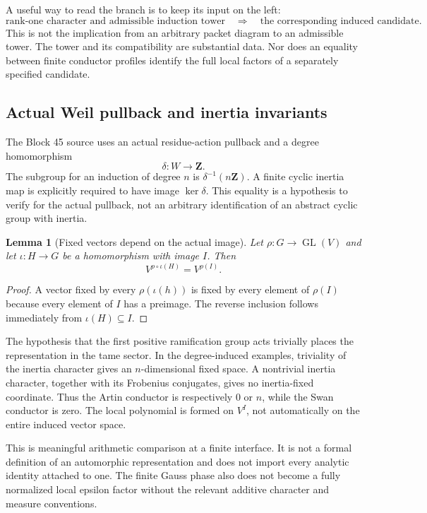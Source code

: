 \documentclass[11pt]{article}
\newtheorem{lemma}[proposition]{Lemma}
\theoremstyle{definition}\newtheorem{definition}[proposition]{Definition}
\newcommand{\GL}{\operatorname{GL}}
\newcommand{\Z}{\mathbf Z}
\begin{document}
A useful way to read the branch is to keep its input on the left:
\[
 \text{rank-one character and admissible induction tower}
 \quad\Longrightarrow\quad
 \text{the corresponding induced candidate}.
\]
This is not the implication from an arbitrary packet diagram to an admissible tower. The tower and its compatibility are substantial data. Nor does an equality between finite conductor profiles identify the full local factors of a separately specified candidate.

\subsection{Actual Weil pullback and inertia invariants}
The Block 45 source uses an actual residue-action pullback and a degree homomorphism
\[
 \delta:W\longrightarrow\Z.
\]
The subgroup for an induction of degree $n$ is $\delta^{-1}(n\Z)$. A finite cyclic inertia map is explicitly required to have image $\ker\delta$. This equality is a hypothesis to verify for the actual pullback, not an arbitrary identification of an abstract cyclic group with inertia.

\begin{lemma}[Fixed vectors depend on the actual image]\label{lem:image}
Let $\rho:G\to\GL(V)$ and let $\iota:H\to G$ be a homomorphism with image $I$. Then
\[
 V^{\rho\circ\iota(H)}=V^{\rho(I)}.
\]
\end{lemma}
\begin{proof}
A vector fixed by every $\rho(\iota(h))$ is fixed by every element of $\rho(I)$ because every element of $I$ has a preimage. The reverse inclusion follows immediately from $\iota(H)\subseteq I$.
\end{proof}

The hypothesis that the first positive ramification group acts trivially places the representation in the tame sector. In the degree-induced examples, triviality of the inertia character gives an $n$-dimensional fixed space. A nontrivial inertia character, together with its Frobenius conjugates, gives no inertia-fixed coordinate. Thus the Artin conductor is respectively $0$ or $n$, while the Swan conductor is zero. The local polynomial is formed on $V^I$, not automatically on the entire induced vector space.

This is meaningful arithmetic comparison at a finite interface. It is not a formal definition of an automorphic representation and does not import every analytic identity attached to one. The finite Gauss phase also does not become a fully normalized local epsilon factor without the relevant additive character and measure conventions.
\end{document}
